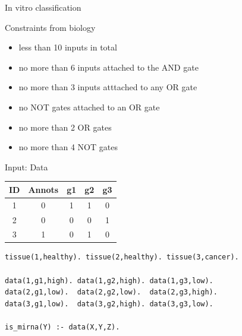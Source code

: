\documentclass[10pt,dvipsnames]{beamer}
\begin{document}
\begin{frame}{In vitro classification}
\end{frame}


\begin{frame}{Constraints from biology}
\begin{itemize}
\item less than 10 inputs in total
\item no more than 6 inputs attached to the AND gate
\item no more than 3 inputs atttached to any OR gate
\item no NOT gates attached to an OR gate
\item no more than 2 OR gates
\item no more than 4 NOT gates
\end{itemize}
\end{frame}


\begin{frame}[fragile]{Input: Data}
\begin{center}
\begin{tabular}{|c|c|c|c|c|}
\hline
ID&	Annots&	g1&	g2&	g3\\
\hline
1&	0&	1&	1&	0\\
2&	0&	0&	0&	1\\
3&	1&	0&	1&	0\\
\hline
\end{tabular}
\end{center}
\vspace{0.2cm}
\begin{verbatim}
tissue(1,healthy). tissue(2,healthy). tissue(3,cancer).
 
data(1,g1,high). data(1,g2,high). data(1,g3,low).
data(2,g1,low).  data(2,g2,low).  data(2,g3,high).
data(3,g1,low).  data(3,g2,high). data(3,g3,low).
 
is_mirna(Y) :- data(X,Y,Z).
\end{verbatim}
\end{frame}
\end{document}
